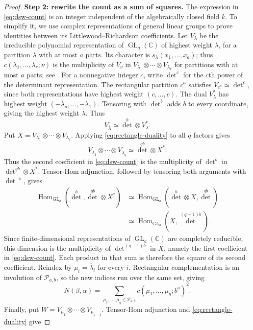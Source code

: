 \documentclass[a4paper,reqno,10pt]{amsart}
\theoremstyle{definition}
\numberwithin{equation}{section}
\newcommand{\C}{\mathbb C}
\newcommand{\Hom}{\operatorname{Hom}}
\newcommand{\GL}{\operatorname{GL}}
\newcommand{\parts}{\mathcal P}
\begin{document}
\begin{proof}
\textbf{Step 2: rewrite the count as a sum of squares.}
The expression in \eqref{eq:dsw-count} is an integer independent of the
algebraically closed field $k$. To simplify it, we use complex
representations of general linear groups to prove identities between
its Littlewood--Richardson coefficients.
Let $V_\lambda$ be the irreducible polynomial representation of
$\GL_a(\C)$ of highest weight $\lambda$, for a partition $\lambda$
with at most $a$ parts. Its character is $s_\lambda(x_1,\ldots,x_a)$;
thus $c(\lambda_1,\ldots,\lambda_r;\nu)$ is the multiplicity of
$V_\nu$ in $V_{\lambda_1}\otimes\cdots\otimes V_{\lambda_r}$
for partitions with at most $a$ parts; see \cite[Section~1]{PPY}.
For a nonnegative integer $c$, write $\det^c$ for the $c$th power of
the determinant representation. The rectangular partition $c^a$ satisfies
$V_{c^a}\simeq\det^c$, since both representations have highest weight
$(c,\ldots,c)$.
The dual $V_\lambda^*$ has highest weight
$(-\lambda_a,\ldots,-\lambda_1)$. Tensoring with $\det^b$ adds $b$
to every coordinate, giving the highest weight
$\overline\lambda$. Thus
\begin{equation}\label{eq:rectangle-duality}
 V_{\overline\lambda}\simeq\det^b\otimes V_\lambda^*.
\end{equation}
Put $X=V_{\lambda_1}\otimes\cdots\otimes V_{\lambda_q}$. Applying
\eqref{eq:rectangle-duality} to all $q$ factors gives
\[
 V_{\overline\lambda_1}\otimes\cdots\otimes V_{\overline\lambda_q}
   \simeq\det^{qb}\otimes X^*.
\]
Thus the second coefficient in \eqref{eq:dsw-count} is the multiplicity
of $\det^b$ in $\det^{qb}\otimes X^*$.
Tensor-Hom adjunction, followed by tensoring both arguments with
$\det^{-b}$, gives
\begin{align*}
 \Hom_{\GL_a}(\det^b,\det^{qb}\otimes X^*)
 &\simeq\Hom_{\GL_a}(\det^b\otimes X,\det^{qb})\\
 &\simeq\Hom_{\GL_a}(X,\det^{(q-1)b}).
\end{align*}
Since finite-dimensional representations of $\GL_a(\C)$ are completely
reducible, this dimension is the multiplicity of
$\det^{(q-1)b}$ in $X$, namely the first coefficient in
\eqref{eq:dsw-count}. Each product in that sum is therefore the square
of its second coefficient. Reindex by $\mu_i=\overline\lambda_i$ for
every $i$. Rectangular complementation is an involution of
$\parts_{a,b}$, so the new indices run over the same set, giving
\[
 N(\beta,\alpha)=
 \sum_{\mu_1,\ldots,\mu_q\in\parts_{a,b}}
 c(\mu_1,\ldots,\mu_q;b^a)^2.
\]
Finally, put $W=V_{\mu_1}\otimes\cdots\otimes V_{\mu_{q-1}}$.
Tensor-Hom adjunction and \eqref{eq:rectangle-duality} give

\end{proof}
\end{document}
